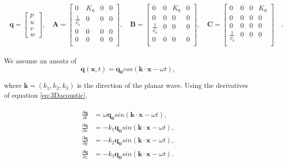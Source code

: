 \begin{align}
    \begin{split}
        \mathbf{q} = \begin{bmatrix}
            p \\
            u \\
            v \\
            w 
        \end{bmatrix}, \quad
        \mathbf{A} = \begin{bmatrix}
            0 & K_0 & 0 & 0 \\
            \frac{1}{\rho_0} & 0 & 0 & 0 \\
            0 & 0 & 0 & 0 \\
            0 & 0 & 0 & 0 \\
        \end{bmatrix}, \quad
        \mathbf{B} = \begin{bmatrix}
            0 & 0 & K_0 & 0 \\
            0 & 0 & 0 & 0 \\
            \frac{1}{\rho_0} & 0 & 0 & 0 \\
            0 & 0 & 0 & 0 \\
        \end{bmatrix}, \quad
        \mathbf{C} = \begin{bmatrix}
            0 & 0 & 0 & K_0 \\
            0 & 0 & 0 & 0 \\
            0 & 0 & 0 & 0 \\
            \frac{1}{\rho_0} & 0 & 0 & 0 \\
        \end{bmatrix} \quad .
    \end{split}
\end{align}

We assume an ansatz of 
\begin{equation}
    \mathbf{q}\left(\mathbf{x}, t\right) = \mathbf{q_0} cos\left(\mathbf{k}\cdot\mathbf{x} - \omega t\right),
\end{equation}

where $\mathbf{k}=\left(k_1, k_2, k_3\right)$ is the direction of the planar wave. Using the derivatives of equation \ref{eq:3Dacoustic},

\begin{align}
    \begin{split}
    \frac{\partial \mathbf{q}}{\partial t} &= \omega \mathbf{q_0} sin\left(\mathbf{k}\cdot\mathbf{x} - \omega t\right), \\
    \frac{\partial \mathbf{q}}{\partial x} &= -k_1 \mathbf{q_0} sin\left(\mathbf{k}\cdot\mathbf{x} - \omega t\right), \\
    \frac{\partial \mathbf{q}}{\partial y} &= -k_2 \mathbf{q_0} sin\left(\mathbf{k}\cdot\mathbf{x} - \omega t\right), \\
    \frac{\partial \mathbf{q}}{\partial z} &= -k_3 \mathbf{q_0} sin\left(\mathbf{k}\cdot\mathbf{x} - \omega t\right).
\end{split}
\end{align}

